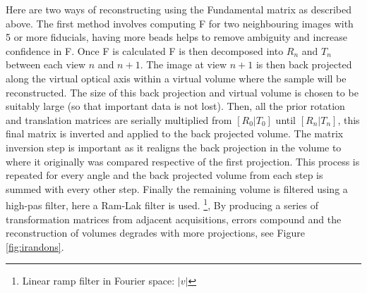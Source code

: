 Here are two ways of reconstructing using the Fundamental matrix as described above.
The first method involves computing F for two neighbouring images with 5 or more fiducials, having more beads helps to remove ambiguity and increase confidence in F.
Once F is calculated F is then decomposed into $R_n$ and $T_n$ between each view $n$ and $n+1$.
The image at view $n+1$ is then back projected along the virtual optical axis within a virtual volume where the sample will be reconstructed.
The size of this back projection and virtual volume is chosen to be suitably large (so that important data is not lost).
Then, all the prior rotation and translation matrices are serially multiplied from $[R_0|T_0]$ until $[R_n|T_n]$, this final matrix is inverted and applied to the back projected volume.
The matrix inversion step is important as it realigns the back projection in the volume to where it originally was compared respective of the first projection.
This process is repeated for every angle and the back projected volume from each step is summed with every other step.
Finally the remaining volume is filtered using a high-pas filter, here a Ram-Lak filter is used.
\footnote{Linear ramp filter in Fourier space: $|v|$},
By producing a series of transformation matrices from adjacent acquisitions, errors compound and the reconstruction of volumes degrades with more projections, see Figure \ref{fig:irandons}.

